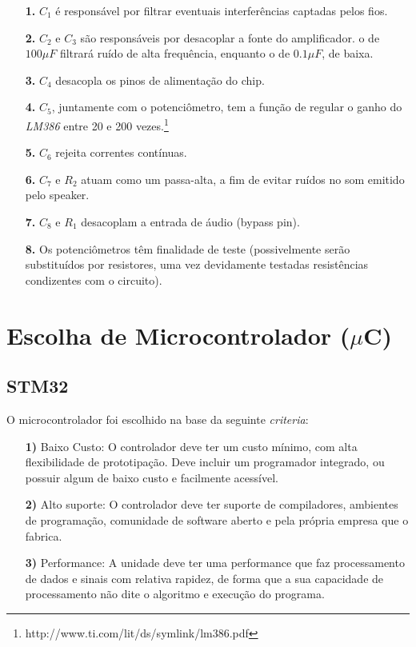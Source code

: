 \documentclass[11pt,a4paper]{report}
\begin{document}
	\begin{itemize}
		\item[{\bf 1.}]$C_1$ é responsável por filtrar eventuais interferências captadas pelos fios.
		\item[{\bf 2.}]$C_2$ e $C_3$ são responsáveis por desacoplar a fonte do amplificador. o de $100\mu{F}$ filtrará ruído de alta frequência, enquanto o de $0.1\mu{F}$, de baixa.
		\item[{\bf 3.}]$C_4$ desacopla os pinos de alimentação do chip.
		\item[{\bf 4.}]$C_5$, juntamente com o potenciômetro, tem a função de regular o ganho do {\it LM386} entre 20 e 200 vezes.\footnote{http://www.ti.com/lit/ds/symlink/lm386.pdf}
		\item[{\bf 5.}]$C_6$ rejeita correntes contínuas.
		\item[{\bf 6.}]$C_7$ e $R_2$ atuam como um passa-alta, a fim de evitar ruídos no som emitido pelo speaker.
		\item[{\bf 7.}]$C_8$ e $R_1$ desacoplam a entrada de áudio (bypass pin).
		\item[{\bf 8.}]Os potenciômetros têm finalidade de teste (possivelmente serão substituídos por resistores, uma vez devidamente testadas resistências condizentes com o circuito).
	\end{itemize}

\section{Escolha de Microcontrolador ($\mu$C)}
	\subsection{STM32}
	O microcontrolador foi escolhido na base da seguinte {\it criteria}:
	
	\begin{itemize}
		\item[{\bf 1)}]Baixo Custo: O controlador deve ter um custo mínimo, com alta flexibilidade de prototipação. Deve incluir um programador integrado, ou possuir algum de baixo custo e facilmente acessível.
		
		\item[{\bf 2)}] Alto suporte: O controlador deve ter suporte de compiladores, ambientes de programação, comunidade de software aberto e pela própria empresa que o fabrica.
		
		\item[{\bf 3)}] Performance: A unidade deve ter uma performance que faz processamento de dados e sinais com relativa rapidez, de forma que a sua capacidade de processamento não dite o algoritmo e execução do programa.
	
	\end{itemize}
\end{document}
